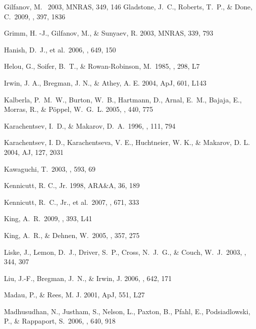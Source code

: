 \documentclass{article}
\begin{document}
\begin{thebibliography}{47}
\bibitem[]{}
 Gilfanov, M. \ 2003, MNRAS, 349, 146
 Gladstone, J.~C., Roberts, T.~P., \& Done, C.\ 2009, \mnras, 397, 1836 

 Grimm, H. -J., Gilfanov, M., \& Sunyaev, R. 2003, MNRAS, 339, 793

 Hanish, D.~J., et al.\ 2006, \apj, 649, 150 

 Helou, G., Soifer, B.~T., \& Rowan-Robinson, M.\ 1985, \apjl, 298, L7 

 Irwin, J. A., Bregman, J. N., \& Athey, A. E. 2004, ApJ, 601, L143

{Kalberla}, P.~M.~W., {Burton}, W.~B., {Hartmann}, D., {Arnal}, E.~M.,
  {Bajaja}, E., {Morras}, R., \& {P{\"o}ppel}, W.~G.~L. 2005, \aap, 440, 775

 Karachentsev, I.~D., \& Makarov, D.~A.\ 1996, \aj, 111, 794 

 Karachentsev, I. D., Karachentseva, V. E., Huchtneier, W. K., \& 
     Makarov, D. L. 2004, AJ, 127, 2031

 Kawaguchi, T.\ 2003, \apj, 593, 69 

 Kennicutt, R. C., Jr. 1998, ARA\&A, 36, 189

 Kennicutt, R.~C., Jr., et al.\ 2007, \apj, 671, 333 

 King, A.~R.\ 2009, \mnras, 393, L41 

 King, A.~R., \& Dehnen, W.\ 2005, \mnras, 357, 275 

 Liske, J., Lemon, D.~J., Driver, S.~P., Cross, N.~J.~G., \& Couch, W.~J.\ 2003, \mnras, 344, 307 

 {Liu}, J.-F., {Bregman}, J.~N., \& {Irwin}, J. 2006, \apj, 642, 171

 Madau, P., \& Rees, M. J. 2001, ApJ, 551, L27

 Madhusudhan, N., Justham, S., Nelson, L., Paxton, B., Pfahl, E., Podsiadlowski, P., 
  \& Rappaport, S.\ 2006, \apj, 640, 918 


\end{thebibliography}
\end{document}
